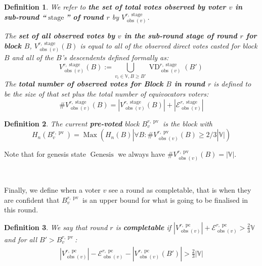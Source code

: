 \documentclass{book}
\newcommand{\assign}{:=}
\newcommand{\nosymbol}{}
\newcommand{\tmop}[1]{\ensuremath{\operatorname{#1}}}
\newcommand{\tmstrong}[1]{\textbf{#1}}
\newcommand{\tmtextbf}[1]{{\bfseries{#1}}}
\newtheorem{definition}{Definition}
\providecommand{\nosymbol}{}
\providecommand{\tmop}[1]{\ensuremath{\mathrm{#1}}}
\providecommand{\tmstrong}[1]{\tmtextbf{#1}}
\providecommand{\tmtextbf}[1]{\tmtextbf{#1}}
\newtheorem{definition}{Definition}
\begin{document}
\begin{definition}
  We refer to {\tmstrong{the set of total votes observed by voter $v$ in
  sub-round ``$\tmop{stage}$'' of round $r$}} by {\tmstrong{$V^{r,
  \tmop{stage}}_{\tmop{obs} (v)}^{\nosymbol}_{\nosymbol}$}}.
  
  The {\tmstrong{set of all observed votes by $v$ in the sub-round stage of
  round $r$ for block $B$}}, {\tmstrong{$V^{r, \tmop{stage}}_{\tmop{obs} (v)}
  (B)$}} is equal to all of the observed direct votes casted for block $B$ and
  all of the $B$'s descendents defined formally as:
  \[ V^{r, \tmop{stage}}_{\tmop{obs} (v)} (B) \assign \bigcup_{v_i \in
     \mathbb{V}, B \geqslant B'} \tmop{VD}^{r, \tmop{stage}}_{\tmop{obs} (v)}
     (B')_{\nosymbol}^{\nosymbol}_{\nosymbol} \]
  The {\tmstrong{total number of observed votes for Block $B$ in round $r$}}
  is defined to be the size of that set plus the total number of equivocators
  voters:
  \[ \#V^{r, \tmop{stage}}_{\tmop{obs} (v)} (B) = |V^{r,
     \tmop{stage}}_{\tmop{obs} (v)} (B) | + | \mathcal{E}^{r,
     \tmop{stage}}_{\tmop{obs} (v)} | \]
\end{definition}

\begin{definition}
  The current {\tmstrong{pre-voted}} block $B^{r, \tmop{pv}}_v$ is the block
  with
  \[ H_n (B^{r, \tmop{pv}}_v) = \tmop{Max} (H_n (B) | \forall B :
     \#V_{\tmop{obs} (v)}^{r, \tmop{pv}} (B) \geqslant 2 / 3|\mathbb{V}|) \]
\end{definition}

Note that for genesis state $\tmop{Genesis}$ we always have $\#V_{\tmop{obs}
(v)}^{r, \tmop{pv}} (B) = | \mathbb{V} |$.

\

Finally, we define when a voter $v$ see a round as completable, that is when
they are confident that $B_v^{r, \tmop{pv}}$ is an upper bound for what is
going to be finalised in this round. \

\begin{definition}
  \label{defn-grandpa-completable}We say that round $r$ is
  {\tmstrong{completable}} if $|V^{r, \tmop{pc}}_{\tmop{obs} (v)} |
  +\mathcal{E}^{r, \tmop{pc}}_{\tmop{obs} (v)} > \frac{2}{3} \mathbb{V}$ and
  for all $B' > B_v^{r, \tmop{pv}}$:
  \[ \begin{array}{l}
       |V^{r, \tmop{pc}}_{\tmop{obs} (v)} | -\mathcal{E}^{r,
       \tmop{pc}}_{\tmop{obs} (v)} - |V^{r, \tmop{pc}}_{\tmop{obs}
       (v)_{\nosymbol}} (B') | > \frac{2}{3} |\mathbb{V}|
     \end{array} \]
\end{definition}
\end{document}
